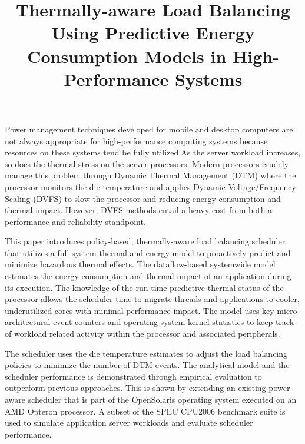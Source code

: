 \documentclass[11pt]{amsart}
\title{Thermally-aware Load Balancing Using Predictive Energy
  Consumption Models in High-Performance Systems}
\begin{document}
\maketitle

  Power management techniques developed for mobile and desktop computers
  are not always appropriate for high-performance computing systems
  because resources on these systems tend be fully utilized.As the
  server workload increases, so does the thermal stress on the
  server processors.  Modern processors crudely manage this problem
  through Dynamic Thermal Management (DTM) where the processor monitors
  the die temperature and applies Dynamic Voltage/Frequency Scaling
  (DVFS) to slow the processor and reducing energy consumption and
  thermal impact.  However, DVFS methods entail a heavy
  cost from both a performance and reliability standpoint.

  This paper introduces policy-based, thermally-aware load balancing
  scheduler that utilizes a full-system thermal and energy model to
  proactively predict and minimize hazardous thermal effects. The
  dataflow-based systemwide model estimates the energy consumption and
  thermal impact of an application during its execution. The knowledge
  of the run-time predictive thermal status of the processor allows the
  scheduler time to migrate threads and applications to cooler,
  underutilized cores with minimal performance impact. The model uses
  key micro-architectural event counters and operating system kernel
  statistics to keep track of workload related activity within the
  processor and associated peripherals.

  The scheduler uses the die temperature estimates to adjust the load
  balancing policies to minimize the number of DTM events.  The
  analytical model and the scheduler performance is demonstrated through
  empirical evaluation to outperform previous approaches. This is shown
  by extending an existing power-aware scheduler that is part of the
  OpenSolaris operating system executed on an AMD Opteron processor.  A
  subset of the SPEC CPU2006 benchmark suite is used to simulate
  application server workloads and evaluate scheduler performance.
\end{document}
